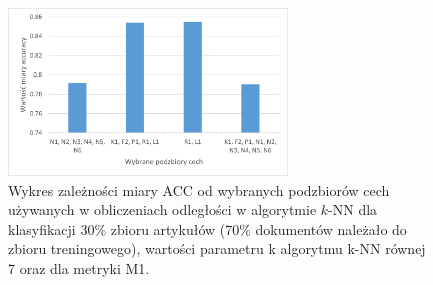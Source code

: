 \documentclass{classrep}
\begin{document}
\begin{figure}[H]
\centering
\includegraphics[width=0.66\textwidth]{wykres8.png}
\caption{Wykres zależności miary ACC od wybranych podzbiorów cech używanych w obliczeniach odległości w algorytmie \(k\)-NN dla klasyfikacji 30\% zbioru artykułów (70\% dokumentów należało do zbioru treningowego), wartości parametru k algorytmu k-NN równej 7 oraz dla metryki M1.}
\end{figure}
\end{document}
